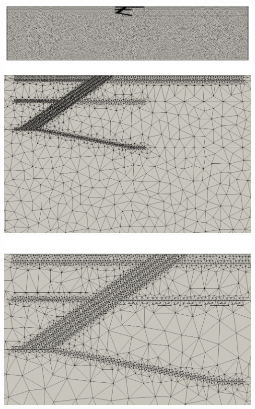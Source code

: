\newpage
\begin{center}
\includegraphics[width=13cm]{python_codes/fieldstone_62/results/mesh1}\\
\includegraphics[width=13cm]{python_codes/fieldstone_62/results/mesh2}\\
\includegraphics[width=13cm]{python_codes/fieldstone_62/results/mesh3}
\end{center}

